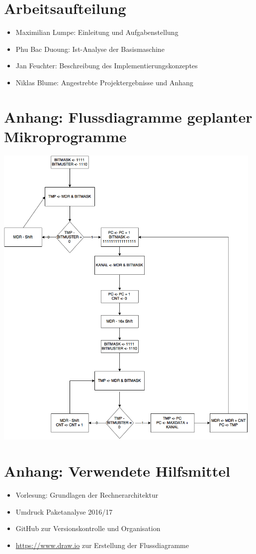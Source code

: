 \documentclass[12pt,titlepage,german,a4]{article}
\begin{document}
	\section{Arbeitsaufteilung}
		\begin{itemize}
			\item Maximilian Lumpe: Einleitung und Aufgabenstellung
			\item Phu Bac Duoung: Ist-Analyse der Basismaschine
			\item Jan Feuchter: Beschreibung des Implementierungskonzeptes
			\item Niklas Blume: Angestrebte Projektergebnisse und Anhang
		\end{itemize}

    \newpage

    \section{Anhang: Flussdiagramme geplanter Mikroprogramme}

	\includegraphics[width=13cm]{algoComplete.png}

	\newpage
    \section{Anhang: Verwendete Hilfsmittel}
	\begin{itemize}
		\item Vorlesung: Grundlagen der Rechnerarchitektur
		\item Umdruck Paketanalyse 2016/17
		\item GitHub zur Versionskontrolle und Organisation
		\item \url{https://www.draw.io} zur Erstellung der Flussdiagramme
	\end{itemize}
\end{document}
